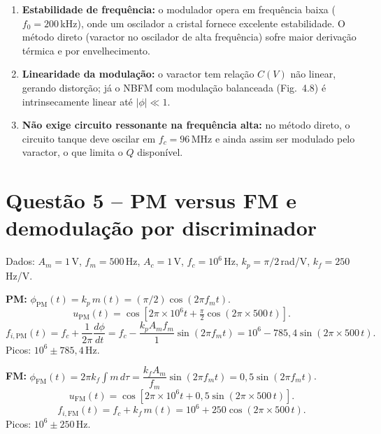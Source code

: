 \documentclass[11pt,a4paper]{article}
\begin{document}
\begin{resolucao}

\begin{enumerate}\itemsep0pt
  \item \textbf{Estabilidade de frequência:} o modulador opera em frequência baixa ($f_0 = 200$\,kHz), onde um oscilador a cristal fornece excelente estabilidade. O método direto (varactor no oscilador de alta frequência) sofre maior derivação térmica e por envelhecimento.
  \item \textbf{Linearidade da modulação:} o varactor tem relação $C(V)$ não linear, gerando distorção; já o NBFM com modulação balanceada (Fig.~4.8) é intrinsecamente linear até $|\phi| \ll 1$.
  \item \textbf{Não exige circuito ressonante na frequência alta:} no método direto, o circuito tanque deve oscilar em $f_c = 96$\,MHz e ainda assim ser modulado pelo varactor, o que limita o $Q$ disponível.
\end{enumerate}
\end{resolucao}

\section*{Questão 5 -- PM versus FM e demodulação por discriminador}

\begin{resolucao}

Dados: $A_m = 1$\,V, $f_m = 500$\,Hz, $A_c = 1$\,V, $f_c = 10^6$\,Hz, $k_p = \pi/2$\,rad/V, $k_f = 250$\,Hz/V.

\textbf{PM:} $\phi_{\text{PM}}(t) = k_p\,m(t) = (\pi/2)\cos(2\pi f_m t)$.
\[
  u_{\text{PM}}(t) = \cos\!\left[2\pi \times 10^6 t + \tfrac{\pi}{2}\cos(2\pi \times 500\,t)\right].
\]
\[
  f_{i,\text{PM}}(t) = f_c + \frac{1}{2\pi}\frac{d\phi}{dt} = f_c - \frac{k_p A_m f_m}{1}\sin(2\pi f_m t) = 10^6 - 785{,}4\sin(2\pi \times 500\,t).
\]
Picos: $10^6 \pm 785{,}4$\,Hz.

\textbf{FM:} $\phi_{\text{FM}}(t) = 2\pi k_f \!\int m\,d\tau = \dfrac{k_f A_m}{f_m}\sin(2\pi f_m t) = 0{,}5\sin(2\pi f_m t)$.
\[
  u_{\text{FM}}(t) = \cos\!\left[2\pi \times 10^6 t + 0{,}5\sin(2\pi \times 500\,t)\right].
\]
\[
  f_{i,\text{FM}}(t) = f_c + k_f\,m(t) = 10^6 + 250\cos(2\pi \times 500\,t).
\]
Picos: $10^6 \pm 250$\,Hz.
\end{resolucao}
\end{document}
